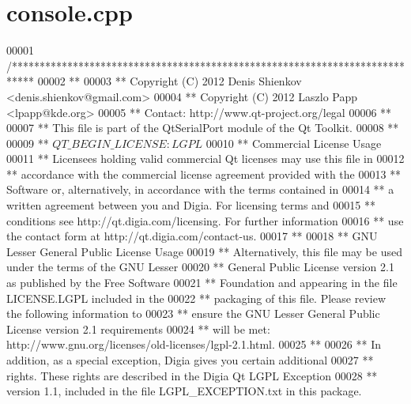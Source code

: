 \hypertarget{a00032_source}{\section{console.\+cpp}
\label{a00032_source}
}

\begin{DoxyCode}
00001 \textcolor{comment}{/****************************************************************************}
00002 \textcolor{comment}{**}
00003 \textcolor{comment}{** Copyright (C) 2012 Denis Shienkov <denis.shienkov@gmail.com>}
00004 \textcolor{comment}{** Copyright (C) 2012 Laszlo Papp <lpapp@kde.org>}
00005 \textcolor{comment}{** Contact: http://www.qt-project.org/legal}
00006 \textcolor{comment}{**}
00007 \textcolor{comment}{** This file is part of the QtSerialPort module of the Qt Toolkit.}
00008 \textcolor{comment}{**}
00009 \textcolor{comment}{** $QT\_BEGIN\_LICENSE:LGPL$}
00010 \textcolor{comment}{** Commercial License Usage}
00011 \textcolor{comment}{** Licensees holding valid commercial Qt licenses may use this file in}
00012 \textcolor{comment}{** accordance with the commercial license agreement provided with the}
00013 \textcolor{comment}{** Software or, alternatively, in accordance with the terms contained in}
00014 \textcolor{comment}{** a written agreement between you and Digia.  For licensing terms and}
00015 \textcolor{comment}{** conditions see http://qt.digia.com/licensing.  For further information}
00016 \textcolor{comment}{** use the contact form at http://qt.digia.com/contact-us.}
00017 \textcolor{comment}{**}
00018 \textcolor{comment}{** GNU Lesser General Public License Usage}
00019 \textcolor{comment}{** Alternatively, this file may be used under the terms of the GNU Lesser}
00020 \textcolor{comment}{** General Public License version 2.1 as published by the Free Software}
00021 \textcolor{comment}{** Foundation and appearing in the file LICENSE.LGPL included in the}
00022 \textcolor{comment}{** packaging of this file.  Please review the following information to}
00023 \textcolor{comment}{** ensure the GNU Lesser General Public License version 2.1 requirements}
00024 \textcolor{comment}{** will be met: http://www.gnu.org/licenses/old-licenses/lgpl-2.1.html.}
00025 \textcolor{comment}{**}
00026 \textcolor{comment}{** In addition, as a special exception, Digia gives you certain additional}
00027 \textcolor{comment}{** rights.  These rights are described in the Digia Qt LGPL Exception}
00028 \textcolor{comment}{** version 1.1, included in the file LGPL\_EXCEPTION.txt in this package.}

\end{DoxyCode}
